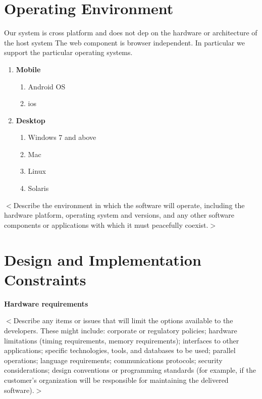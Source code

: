 \documentclass{scrreprt}
\begin{document}

\section{Operating Environment}
  Our system is cross platform and does not dep
 on the hardware or architecture of the host system The web component is browser independent. In particular we support the particular operating systems.
  \begin{enumerate}
  \item \textbf{Mobile}\\
  \begin{enumerate}
  \item Android OS
  \item ios
  \end{enumerate}
  \item \textbf{Desktop}\\
  \begin{enumerate}
     \item Windows 7 and above
     \item Mac
     \item Linux
     \item Solaris
  \end{enumerate}
  \end{enumerate}
 
$<$Describe the environment in which the software will operate, including the 
hardware platform, operating system and versions, and any other software 
components or applications with which it must peacefully coexist.$>$
 
\section{Design and Implementation Constraints}
\textbf {Hardware requirements}
 
$<$Describe any items or issues that will limit the options available to the 
developers. These might include: corporate or regulatory policies; hardware 
limitations (timing requirements, memory requirements); interfaces to other 
applications; specific technologies, tools, and databases to be used; parallel 
operations; language requirements; communications protocols; security 
considerations; design conventions or programming standards (for example, if the 
customer’s organization will be responsible for maintaining the delivered 
software).$>$
\end{document}
